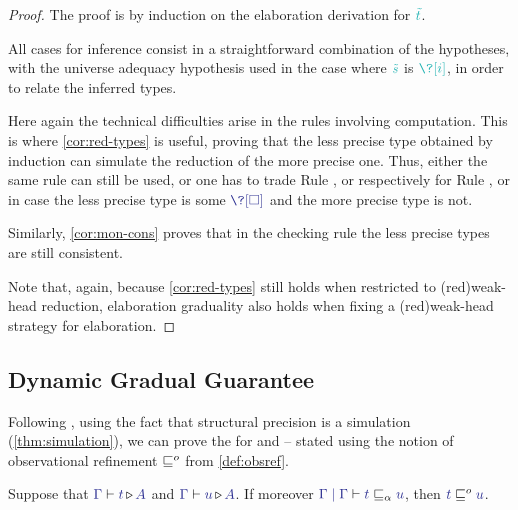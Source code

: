 \begin{proof}
	The proof is by induction on the elaboration derivation for $\scol{\tilde{t}}$.
  
  All cases for inference consist in a straightforward combination of the hypotheses,
  with the universe adequacy hypothesis used in the case where $\scol{\tilde{s}}$
  is $\scol{\?[i]}$, in order to relate the inferred types.

	Here again the technical difficulties arise in the rules involving computation.
  This is where \cref{cor:red-types} is useful, proving that the less precise type
  obtained by induction can simulate the reduction of the more precise one.
  Thus, either the same rule can still be used, or one has to trade Rule
  ,  or
   respectively for Rule ,
   or  in case the less precise type is some $\tcol{\?[\uni]}$ and the more precise type is not.
  
  Similarly, \cref{cor:mon-cons} proves that in the checking rule
  the less precise types are still consistent.
  
  Note that, again, because \cref{cor:red-types} still holds when restricted
  to \kl(red){weak-head} reduction,
  elaboration graduality also holds when fixing a \kl(red){weak-head} strategy for
  elaboration.
\end{proof}

\subsection{Dynamic Gradual Guarantee}

Following , using the fact that structural precision is
a simulation (\cref{thm:simulation}), we can prove the  for 
and  – stated using the notion of observational refinement
$\sqsubseteq^{o}$ from \cref{def:obsref}.

\begin{theorem}
  \label{thm:dgg}
  Suppose that $\inferty{\tcol{\Gamma}}{\tcol{t}}{\tcol{A}}$ and
  $\inferty{\tcol{\Gamma}}{\tcol{u}}{\tcol{A}}$.
  If moreover $\tcol{\Gamma \mid \Gamma} \vdash \tcol{t} \capre \tcol{u}$,
  then $\tcol{t} \obsRef \tcol{u}$.
\end{theorem}

